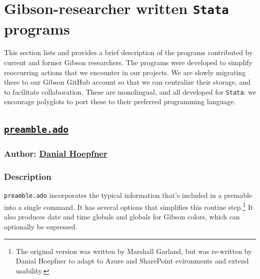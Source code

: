 {\section{Gibson-researcher written \texttt{Stata} programs} \label{sec:ados}
This section lists and provides a brief description of the programs contributed by current and former Gibson researchers. The programs were developed to simplify reoccurring actions that we encounter in our projects. We are slowly migrating these to our Gibson GitHub account so that we can centralize their storage, and to facilitate collaboration. These are monolingual, and all developed for \texttt{Stata}: we encourage polyglots to port these to their preferred programming language.
\subsection{\href{https://github.com/GibsonConsult/preamble-ado}{\texttt{preamble.ado}}}
\subsubsection{Author: \href{mailto:dhoepfner@gibsonconsult.com}{Danial Hoepfner}}
\subsubsection{Description}
\texttt{preamble.ado} incorporates the typical information that's included in a premable into a single command. It has several options that simplifies this routine step.\footnote{The original version was written by Marshall Garland, but was re-written by Danial Hoepfner to adapt to Azure and SharePoint evironments and extend usability.} It also produces date and time globals and globals for Gibson colors, which can optionally be supressed.
}
